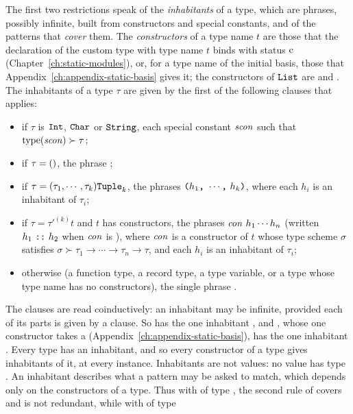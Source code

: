The first two restrictions speak of the \emph{inhabitants} of a type, which are
phrases, possibly infinite, built from constructors and special constants, and
of the patterns that \emph{cover} them. The \emph{constructors} of a type name $t$ are those
that the declaration of the custom type with type name $t$ binds with status
$\mathrm{c}$ (Chapter~\ref{ch:static-modules}), or, for a type name of the initial
basis, those that Appendix~\ref{ch:appendix-static-basis} gives it; the
constructors of $\mathtt{List}$ are \kw{[]} and \kw{::}. The inhabitants of a type
$\tau$ are given by the first of the following clauses that applies:
\begin{itemize}
\item if $\tau$ is $\mathtt{Int}$, $\mathtt{Char}$ or $\mathtt{String}$, each special constant
  $\mathit{scon}$ such that $\mathrm{type}(\mathit{scon}) \succ \tau$;
\item if $\tau = \mathtt{()}$, the phrase \kw{()};
\item if $\tau = (\tau_1, \cdots, \tau_k)\mathtt{Tuple}_{k}$, the phrases
  $\kw{(}h_1\kw{,}\allowbreak\ \cdots\kw{,}\allowbreak\ h_k\kw{)}$, where each
  $h_i$ is an inhabitant of $\tau_i$;
\item if $\tau = \tau'^{(k)}t$ and $t$ has constructors, the phrases
  $\mathit{con}\ h_1 \cdots h_n$ (written $h_1\ \kw{::}\ h_2$ when $\mathit{con}$ is
  \kw{::}), where $\mathit{con}$ is a constructor of $t$ whose type scheme $\sigma$
  satisfies $\sigma \succ \tau_1 \rightarrow \cdots \rightarrow \tau_n
  \rightarrow \tau$, and each $h_i$ is an inhabitant of $\tau_i$;
\item otherwise (a function type, a record type, a type variable, or a type
  whose type name has no constructors), the single phrase \kw{\_}.
\end{itemize}
The clauses are read coinductively: an inhabitant may be infinite, provided
each of its parts is given by a clause. So  has the one
inhabitant , and , whose one constructor
 takes a 
(Appendix~\ref{ch:appendix-static-basis}), has the one inhabitant
. Every type has an inhabitant, and so
every constructor of a type gives inhabitants of it, at every instance.
Inhabitants are not values: no value has type . An inhabitant
describes what a pattern may be asked to match, which depends only on the
constructors of a type. Thus with  of type , the
second rule of  covers
 and is not redundant, while with  of type
